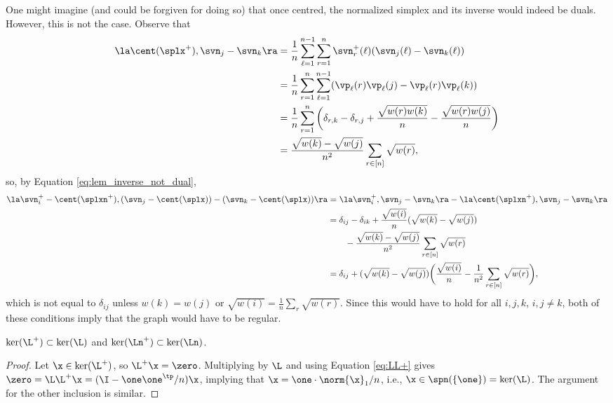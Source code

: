 One might imagine (and could be forgiven for doing so) that once centred, the normalized simplex and its inverse would indeed be duals. However, this is not the case. Observe that 
\begin{align*}
\la \cent(\splx^+),\svn_j-\svn_k\ra &= \frac{1}{n}\sum_{\ell=1}^{n-1} \sum_{r=1}^n \svn^+_r(\ell)(\svn_j(\ell)-\svn_k(\ell))  \\&= 
\frac{1}{n}\sum_{r=1}^n \sum_{\ell=1}^{n-1} (\vp_\ell(r)\vp_\ell(j) - \vp_\ell(r)\vp_\ell(k) ) \\
&= \frac{1}{n} \sum_{r=1}^n \bigg(\delta_{r,k} - \delta_{r,j} + \frac{\sqrt{w(r)w(k)}}{n} - \frac{\sqrt{w(r)w(j)}}{n}\bigg) \\
&= \frac{\sqrt{w(k)}-\sqrt{w(j)}}{n^2} \sum_{r\in[n]}\sqrt{w(r)},
\end{align*}
so, by Equation \eqref{eq:lem_inverse_not_dual},
\begin{align*}
\la \svn_i^+-\cent(\splxn^+),(\svn_j-\cent(\splx)) - (\svn_k-\cent(\splx))\ra &= \la \svn_i^+,\svn_j-\svn_k\ra - \la \cent(\splxn^+),\svn_j-\svn_k\ra \\
&= \delta_{ij} - \delta_{ik} + \frac{\sqrt{w(i)}}{n}(\sqrt{w(k)} - \sqrt{w(j)})  \\
&\qquad - \frac{\sqrt{w(k)}-\sqrt{w(j)}}{n^2} \sum_{r\in[n]}\sqrt{w(r)} \\
&= \delta_{ij} + (\sqrt{w(k)}-\sqrt{w(j)})\bigg(\frac{\sqrt{w(i)}}{n} - \frac{1}{n^2}\sum_{r\in[n]}\sqrt{w(r)}\bigg),
\end{align*}
which is not equal to $\delta_{ij}$ unless $w(k)=w(j)$ or $\sqrt{w(i)}= \frac{1}{n}\sum_r \sqrt{w(r)}$. Since this would have to hold for all $i,j,k$, $i,j\neq k$, both of these conditions imply that the graph would have to be regular. 


\begin{lemma}
	$\ker(\L^+)\subset\ker(\L)$ and $\ker(\Ln^+)\subset\ker(\Ln)$.  
\end{lemma}
\begin{proof}
	Let $\x\in\ker(\L^+)$, so $\L^+\x=\zero$. Multiplying by $\L$ and using Equation \eqref{eq:LL+} gives $\zero=\L\L^+\x=(\I-\one\one^\tp/n)\x$, implying that $\x=\one \cdot \norm{\x}_1/n$, i.e., $\x\in\spn(\{\one\})=\ker(\L)$. The argument for the other inclusion is similar.
\end{proof}


